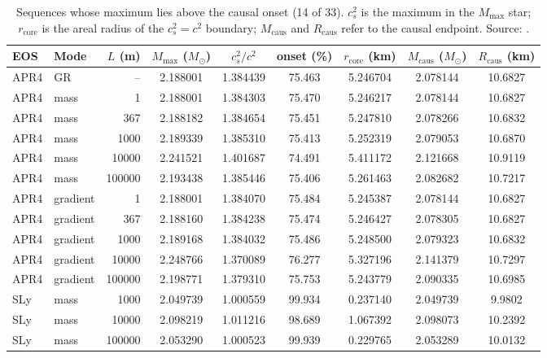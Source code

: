 \documentclass[11pt,a4paper]{article}
\newcommand{\Msun}{M_\odot}
\begin{document}
\begin{table}[t]
\centering
\small
\caption[]{Sequences whose maximum lies above the causal onset (14 of 33). $c_s^2$ is the maximum in the
$M_{\max}$ star; $r_{\mathrm{core}}$ is the areal radius of the $c_s^2=c^2$ boundary; $M_{\mathrm{caus}}$ and
$R_{\mathrm{caus}}$ refer to the causal endpoint. Source: .}
\label{tab:causal}
\footnotesize
\setlength{\tabcolsep}{4pt}
\begin{tabular}{llrcccccc}
\toprule
EOS & Mode & $L$ (m) & $M_{\max}$ ($\Msun$) & $c_s^2/c^2$ & onset (\%) & $r_{\mathrm{core}}$ (km) & $M_{\mathrm{caus}}$ ($\Msun$) & $R_{\mathrm{caus}}$ (km)\\
\midrule
APR4 & GR & -- & 2.188001 & 1.384439 & 75.463 & 5.246704 & 2.078144 & 10.6827\\
APR4 & mass & 1 & 2.188001 & 1.384303 & 75.470 & 5.246217 & 2.078144 & 10.6827\\
APR4 & mass & 367 & 2.188182 & 1.384654 & 75.451 & 5.247810 & 2.078266 & 10.6832\\
APR4 & mass & 1000 & 2.189339 & 1.385310 & 75.413 & 5.252319 & 2.079053 & 10.6870\\
APR4 & mass & 10000 & 2.241521 & 1.401687 & 74.491 & 5.411172 & 2.121668 & 10.9119\\
APR4 & mass & 100000 & 2.193438 & 1.385446 & 75.406 & 5.261463 & 2.082682 & 10.7217\\
APR4 & gradient & 1 & 2.188001 & 1.384070 & 75.484 & 5.245387 & 2.078144 & 10.6827\\
APR4 & gradient & 367 & 2.188160 & 1.384238 & 75.474 & 5.246427 & 2.078305 & 10.6827\\
APR4 & gradient & 1000 & 2.189168 & 1.384032 & 75.486 & 5.248500 & 2.079323 & 10.6832\\
APR4 & gradient & 10000 & 2.248766 & 1.370089 & 76.277 & 5.327196 & 2.141379 & 10.7297\\
APR4 & gradient & 100000 & 2.198771 & 1.379310 & 75.753 & 5.243779 & 2.090335 & 10.6985\\
\midrule
SLy & mass & 1000 & 2.049739 & 1.000559 & 99.934 & 0.237140 & 2.049739 & 9.9802\\
SLy & mass & 10000 & 2.098219 & 1.011216 & 98.689 & 1.067392 & 2.098073 & 10.2392\\
SLy & mass & 100000 & 2.053290 & 1.000523 & 99.939 & 0.229765 & 2.053289 & 10.0132\\
\bottomrule
\end{tabular}
\end{table}
\end{document}
